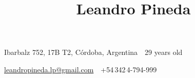 \documentclass[letterpaper,MMMyyyy,nonstop]{simpleresumecv}
\newcommand{\CVAuthor}{Leandro Pineda}
\begin{document}

\title{\CVAuthor}
\vspace{.5cm}
\begin{subtitle}
Ibarbalz 752, 17B T2, Córdoba, Argentina\, \SubBulletSymbol\, 29 years old
\par
\hspace{-4cm}\href{mailto:leandropineda.lp@gmail.com}
{leandropineda.lp@gmail.com}
\,\SubBulletSymbol\,
+54\,342\,4-794-999
\end{subtitle}
 
\hspace{14.5cm}
\end{document}
